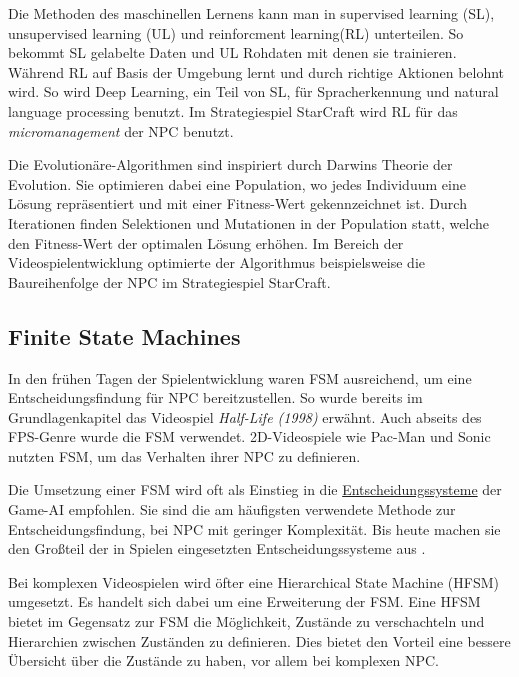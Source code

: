 Die Methoden des maschinellen Lernens kann man in supervised learning (SL), unsupervised learning (UL) und reinforcment learning(RL) unterteilen. So bekommt SL gelabelte Daten und UL Rohdaten mit denen sie trainieren. W\"{a}hrend RL auf Basis der Umgebung lernt und durch richtige Aktionen belohnt wird. So wird Deep Learning, ein Teil von SL, f\"{u}r Spracherkennung und natural language processing benutzt. Im Strategiespiel StarCraft wird RL f\"{u}r das \textit{micromanagement} der NPC benutzt. \autocite{review_game_ai}

Die Evolution\"{a}re-Algorithmen sind inspiriert durch Darwins Theorie der Evolution. Sie optimieren dabei eine Population, wo jedes Individuum eine L\"{o}sung repr\"{a}sentiert und mit einer Fitness-Wert gekennzeichnet ist. Durch Iterationen finden Selektionen und Mutationen in der Population statt, welche den Fitness-Wert der optimalen L\"{o}sung erh\"{o}hen. Im Bereich der Videospielentwicklung optimierte der Algorithmus beispielsweise die Baureihenfolge der NPC im Strategiespiel StarCraft. \autocite{review_game_ai}


\subsection{Finite State Machines}
\label{chap:fsm sota}

In den fr\"{u}hen Tagen der Spielentwicklung waren FSM ausreichend, um eine Entscheidungsfindung f\"{u}r NPC bereitzustellen. So wurde bereits im Grundlagenkapitel das Videospiel \textit{Half-Life (1998)} erw\"{a}hnt. Auch abseits des FPS-Genre wurde die FSM verwendet. 2D-Videospiele wie Pac-Man und Sonic nutzten FSM, um das Verhalten ihrer NPC zu definieren. \autocite{U2023}

Die Umsetzung einer FSM wird oft als Einstieg in die \hyperref[chap:entscheidungssysteme]{Entscheidungssysteme} der Game-AI empfohlen. Sie sind die am h\"{a}ufigsten verwendete Methode zur Entscheidungsfindung, bei NPC mit geringer Komplexit\"{a}t. Bis heute machen sie den Gro\ss{}teil der in Spielen eingesetzten Entscheidungssysteme aus \autocite{AIgames}.

Bei komplexen Videospielen wird \"{o}fter eine Hierarchical State Machine (HFSM) umgesetzt. Es handelt sich dabei um eine Erweiterung der FSM. Eine HFSM bietet im Gegensatz zur FSM die M\"{o}glichkeit, Zust\"{a}nde zu verschachteln und Hierarchien zwischen Zust\"{a}nden zu definieren. Dies bietet den Vorteil eine bessere \"{U}bersicht \"{u}ber die Zust\"{a}nde zu haben, vor allem bei komplexen NPC. \autocite{AIgames}


